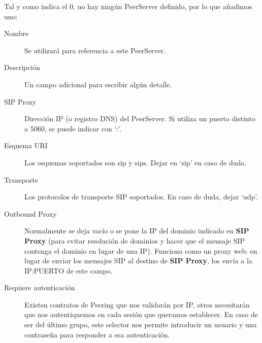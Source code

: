 \documentclass[letterpaper,10pt,spanish]{sphinxmanual}
\begin{document}

Tal y como indica el 0, no hay ningún PeerServer definido, por lo que añadimos uno:

\begin{description}
\item[{Nombre}] \leavevmode{}\label{external_incoming_calls/peering_contracts:term-4}
Se utilizará para referencia a este PeerServer.

\item[{Descripción}] \leavevmode{}\label{external_incoming_calls/peering_contracts:term-5}
Un campo adicional para escribir algún detalle.

\item[{SIP Proxy}] \leavevmode{}\label{external_incoming_calls/peering_contracts:term-sip-proxy}
Dirección IP (o registro DNS) del PeerServer. Si utiliza un puerto distinto a 5060, se puede indicar con `:'.

\item[{Esquema URI}] \leavevmode{}\label{external_incoming_calls/peering_contracts:term-esquema-uri}
Los esquemas soportados son sip y sips. Dejar en `sip' en caso de duda.

\item[{Transporte}] \leavevmode{}\label{external_incoming_calls/peering_contracts:term-transporte}
Los protocolos de transporte SIP soportados. En caso de duda, dejar `udp'.

\item[{Outbound Proxy}] \leavevmode{}\label{external_incoming_calls/peering_contracts:term-outbound-proxy}
Normalmente se deja vacío o se pone la IP del dominio indicado en \textbf{SIP Proxy} (para evitar resolución de dominios y hacer que el mensaje SIP contenga el dominio en lugar de una IP). Funciona como un proxy web: en lugar de enviar los mensajes SIP al destino de \textbf{SIP Proxy}, los envía a la IP:PUERTO de este campo.

\item[{Requiere autenticación}] \leavevmode{}\label{external_incoming_calls/peering_contracts:term-requiere-autenticacion}
Existen contratos de Peering que nos validarán por IP, otros necesitarán que nos autentiquemos en cada sesión que queramos establecer. En caso de ser del último grupo, este selector nos permite introducir un usuario y una contraseña para responder a esa autenticación.


\end{description}
\end{document}
